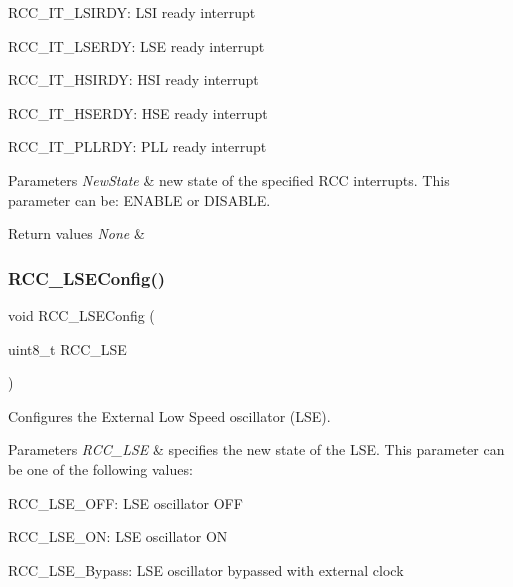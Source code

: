 \begin{DoxyItemize}
\item R\+C\+C\+\_\+\+I\+T\+\_\+\+L\+S\+I\+R\+DY\+: L\+SI ready interrupt \item R\+C\+C\+\_\+\+I\+T\+\_\+\+L\+S\+E\+R\+DY\+: L\+SE ready interrupt \item R\+C\+C\+\_\+\+I\+T\+\_\+\+H\+S\+I\+R\+DY\+: H\+SI ready interrupt \item R\+C\+C\+\_\+\+I\+T\+\_\+\+H\+S\+E\+R\+DY\+: H\+SE ready interrupt \item R\+C\+C\+\_\+\+I\+T\+\_\+\+P\+L\+L\+R\+DY\+: P\+LL ready interrupt\end{DoxyItemize}

\begin{DoxyParams}{Parameters}
{\em New\+State} & new state of the specified R\+CC interrupts. This parameter can be\+: E\+N\+A\+B\+LE or D\+I\+S\+A\+B\+LE. \\
\hline
\end{DoxyParams}

\begin{DoxyRetVals}{Return values}
{\em None} & \\
\hline
\end{DoxyRetVals}
\mbox{\label{group___r_c_c___exported___functions_ga65209ab5c3589b249c7d70f978735ca6}} 
\subsubsection{\texorpdfstring{RCC\_LSEConfig()}{RCC\_LSEConfig()}}
{\footnotesize\ttfamily void R\+C\+C\+\_\+\+L\+S\+E\+Config (\begin{DoxyParamCaption}\item[{uint8\+\_\+t}]{R\+C\+C\+\_\+\+L\+SE }\end{DoxyParamCaption})}



Configures the External Low Speed oscillator (L\+SE). 


\begin{DoxyParams}{Parameters}
{\em R\+C\+C\+\_\+\+L\+SE} & specifies the new state of the L\+SE. This parameter can be one of the following values\+: \begin{DoxyItemize}
\item R\+C\+C\+\_\+\+L\+S\+E\+\_\+\+O\+FF\+: L\+SE oscillator O\+FF \item R\+C\+C\+\_\+\+L\+S\+E\+\_\+\+ON\+: L\+SE oscillator ON \item R\+C\+C\+\_\+\+L\+S\+E\+\_\+\+Bypass\+: L\+SE oscillator bypassed with external clock \end{DoxyItemize}
\\
\hline
\end{DoxyParams}

